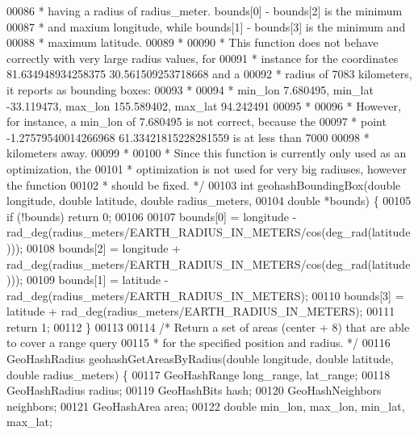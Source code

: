 \begin{DoxyCode}
00086 \textcolor{comment}{ * having a radius of radius\_meter. bounds[0] - bounds[2] is the minimum}
00087 \textcolor{comment}{ * and maxium longitude, while bounds[1] - bounds[3] is the minimum and}
00088 \textcolor{comment}{ * maximum latitude.}
00089 \textcolor{comment}{ *}
00090 \textcolor{comment}{ * This function does not behave correctly with very large radius values, for}
00091 \textcolor{comment}{ * instance for the coordinates 81.634948934258375 30.561509253718668 and a}
00092 \textcolor{comment}{ * radius of 7083 kilometers, it reports as bounding boxes:}
00093 \textcolor{comment}{ *}
00094 \textcolor{comment}{ * min\_lon 7.680495, min\_lat -33.119473, max\_lon 155.589402, max\_lat 94.242491}
00095 \textcolor{comment}{ *}
00096 \textcolor{comment}{ * However, for instance, a min\_lon of 7.680495 is not correct, because the}
00097 \textcolor{comment}{ * point -1.27579540014266968 61.33421815228281559 is at less than 7000}
00098 \textcolor{comment}{ * kilometers away.}
00099 \textcolor{comment}{ *}
00100 \textcolor{comment}{ * Since this function is currently only used as an optimization, the}
00101 \textcolor{comment}{ * optimization is not used for very big radiuses, however the function}
00102 \textcolor{comment}{ * should be fixed. */}
00103 \textcolor{keywordtype}{int} geohashBoundingBox(\textcolor{keywordtype}{double} longitude, \textcolor{keywordtype}{double} latitude, \textcolor{keywordtype}{double} radius\_meters,
00104                        \textcolor{keywordtype}{double} *bounds) \{
00105     \textcolor{keywordflow}{if} (!bounds) \textcolor{keywordflow}{return} 0;
00106 
00107     bounds[0] = longitude - rad\_deg(radius\_meters/EARTH\_RADIUS\_IN\_METERS/cos(deg\_rad(latitude)));
00108     bounds[2] = longitude + rad\_deg(radius\_meters/EARTH\_RADIUS\_IN\_METERS/cos(deg\_rad(latitude)));
00109     bounds[1] = latitude - rad\_deg(radius\_meters/EARTH\_RADIUS\_IN\_METERS);
00110     bounds[3] = latitude + rad\_deg(radius\_meters/EARTH\_RADIUS\_IN\_METERS);
00111     \textcolor{keywordflow}{return} 1;
00112 \}
00113 
00114 \textcolor{comment}{/* Return a set of areas (center + 8) that are able to cover a range query}
00115 \textcolor{comment}{ * for the specified position and radius. */}
00116 GeoHashRadius geohashGetAreasByRadius(\textcolor{keywordtype}{double} longitude, \textcolor{keywordtype}{double} latitude, \textcolor{keywordtype}{double} radius\_meters) \{
00117     GeoHashRange long\_range, lat\_range;
00118     GeoHashRadius radius;
00119     GeoHashBits hash;
00120     GeoHashNeighbors neighbors;
00121     GeoHashArea area;
00122     \textcolor{keywordtype}{double} min\_lon, max\_lon, min\_lat, max\_lat;

\end{DoxyCode}
